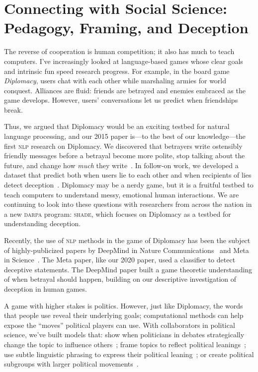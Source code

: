 \documentclass[11pt]{amsart}
\newcommand{\abr}[1]{\textsc{#1}}
\begin{document}
\section{Connecting with Social Science: Pedagogy, Framing, and Deception}

The reverse of cooperation is human competition; it also has much to
teach computers.
%
I've increasingly looked at language-based games whose clear goals and
intrinsic fun speed research progress.
%
For example, in the board game \emph{Diplomacy}, users
chat with each other while marshaling armies for world conquest. Alliances are
fluid: friends are betrayed and enemies embraced as the game develops.
%
However,
users' conversations let us predict when friendships break.

Thus, we argued that Diplomacy would be an exciting testbed for
natural language processing, and our 2015 paper is---to the best of
our knowledge---the first \abr{nlp} research on Diplomacy.
%
We discovered that betrayers write ostensibly friendly messages before
a betrayal become more polite, stop talking about the future, and
change how \emph{much} they write~\cite{niculae-15}.
%
In follow-on work, we developed a dataset that predict both when users
lie to each other and when recipients of lies detect
deception~\cite{Peskov-20}.
%
Diplomacy may be a nerdy game, but it is a fruitful testbed to teach
computers to understand messy, emotional human interactions.
%
We are continuing to look into these questions with researchers from
across the nation in a new \abr{darpa} program: \abr{shade}, which
focuses on Diplomacy as a testbed for understanding deception.

Recently, the use of \abr{nlp} methods in the game of Diplomacy has
been the subject of highly-publicized papers by DeepMind in Nature
Communications~\cite{kramar-22} and Meta in Science~\cite{bakhtin-22}.
%
The Meta paper, like our 2020 paper, used a classifier to detect
deceptive statements.
%
The DeepMind paper built a game theoretic understanding of when
betrayal should happen, building on our descriptive investigation of
deception in human games.

A game with higher stakes is politics. However, just like Diplomacy,
the words that people use reveal their underlying goals; computational
methods can help expose the ``moves'' political players can use. With
collaborators in political science, we've built models that: show when
politicians in debates strategically change the topic to influence
others~\cite{nguyen-12,Nguyen-14b}; frame topics to reflect political
leanings~\cite{nguyen-13:shlda}; use subtle linguistic phrasing to
express their political leaning~\cite{iyyer-14a}; or create political
subgroups with larger political
movements~\cite{Nguyen:Boyd-Graber:Resnik:Miler-2015}.
\end{document}
